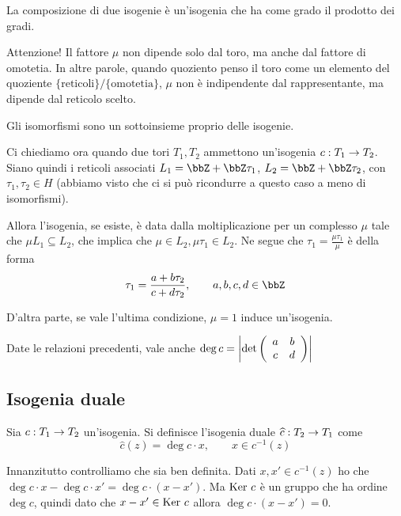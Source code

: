 	\begin{osservazione}
		La composizione di due isogenie è un'isogenia che ha come grado il prodotto dei gradi.
	\end{osservazione}

	Attenzione! Il fattore $\mu$ non dipende solo dal toro, ma anche dal fattore di omotetia. In altre parole, quando quoziento penso il toro come un elemento del quoziente $\{ \mbox{reticoli} \} / \{ \mbox{omotetia} \}$, $\mu$ non è indipendente dal rappresentante, ma dipende dal reticolo scelto.

	\begin{osservazione}
		Gli isomorfismi sono un sottoinsieme proprio delle isogenie.
	\end{osservazione}

	Ci chiediamo ora quando due tori $T_1, T_2$ ammettono un'isogenia $c: T_1 \rightarrow T_2$. Siano quindi i reticoli associati $L_1=\bbZ + \bbZ \tau_1$, $L_2=\bbZ + \bbZ \tau_2$, con $\tau_1,\tau_2 \in H$ (abbiamo visto che ci si può ricondurre a questo caso a meno di isomorfismi).

	Allora l'isogenia, se esiste, è data dalla moltiplicazione per un complesso $\mu$ tale che $\mu L_1 \subseteq L_2$, che implica che $\mu \in L_2, \mu\tau_1 \in L_2$. Ne segue che $\tau_1 = \frac{\mu\tau_1}{\mu}$ è della forma
	\[
		\tau_1 = \frac{a + b\tau_2}{c+d\tau_2}, \qquad a,b,c,d \in \bbZ
	\]

	D'altra parte, se vale l'ultima condizione, $\mu=1$ induce un'isogenia.

    \begin{osservazione}
        Date le relazioni precedenti, vale anche $\deg c = \left| \det \left(\begin{array}{cc} a & b \\ c & d \end{array} \right) \right|$
    \end{osservazione}

	\subsection{Isogenia duale}

	Sia $c: T_1 \rightarrow T_2$ un'isogenia. Si definisce l'isogenia duale $\widehat c: T_2 \rightarrow T_1$ come
	\[
		\hat c(z) = \deg c\cdot x, \qquad x \in c^{-1}(z)
	\]

	Innanzitutto controlliamo che sia ben definita. Dati $x, x' \in c^{-1}(z)$ ho che $\deg c \cdot x - \deg c \cdot x' = \deg c \cdot (x-x')$. Ma $\mbox{Ker } c$ è un gruppo che ha ordine $\deg c$, quindi dato che $x-x' \in \mbox{Ker } c$ allora $\deg c \cdot (x-x') = 0$.

